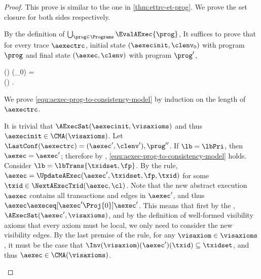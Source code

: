 \begin{proof}
This prove is similar to the one in \cref{thm:ettrc-et-prog}.
We prove the set closure for both sides respectively.
\begin{enumerate}
\Case{\( \bigcup_{\prog \in \Programs} \EvalAExec{\prog} \subseteq \CMA(\visaxioms) \)}
    By the definition of \( \bigcup_{\prog \in \Programs}\EvalAExec{\prog}\),
    It suffices to prove that for every trace \( \aexectrc \), 
    initial state \( (\aexecinit,\clenv_0) \) with program \( \prog \)
    and final state \( (\aexec,\clenv) \) with program \( \prog' \),
    \begin{Formulae}
    \begin{Formula}
        \Dom(\prog) \subseteq \Dom(\clenv_0)
        \land \aexectrc = 
        \\ \aexec \in \CMA(\visaxioms) .
        \label{equ:aexec-prog-to-consistency-model}
    \end{Formula}
    \end{Formulae}
    We prove \cref{equ:aexec-prog-to-consistency-model} by induction on the length of \( \aexectrc \).
    \begin{enumerate*}
        It is trivial that \( \AExecSat(\aexecinit,\visaxioms)\) and thus \( \aexecinit \in \CMA(\visaxioms)\).
        Let \( \LastConf(\aexectrc) =  (\aexec',\clenv'), \prog'' \).
        If \( \lb = \lbPri\), then \( \aexec = \aexec' \);
        therefore by \ih, \cref{equ:aexec-prog-to-consistency-model} holds.
        Consider \( \lb = \lbTrans{\txidset,\fp}  \).
        By the \rAAtomicTrans rule, \( \aexec = \UpdateAExec(\aexec',\txidset,\fp,\txid) \)
        for some \( \txid \in \NextAExecTxid(\aexec,\cl) \).
        Note that the new abstract execution \( \aexec \) contains all transactions and edges in \( \aexec' \),
        and thus \( \aexec \aexeceq[\aexec'\Proj{0}] \aexec' \).
        This means that first by the \ih, \( \AExecSat(\aexec',\visaxioms) \),
        and by the definition of well-formed visibility axioms that every axiom must be local,
        we only need to consider the new visibility edges.
        By the last premise of the \rAAtomicTrans rule,
        for any \( \visaxiom \in \visaxioms \), it must be the case that \( \Inv(\visaxiom)(\aexec')(\txid) \subseteq \txidset \),
        and thus \( \aexec \in \CMA(\visaxioms) \).

\end{enumerate*}
\end{enumerate}
\end{proof}
